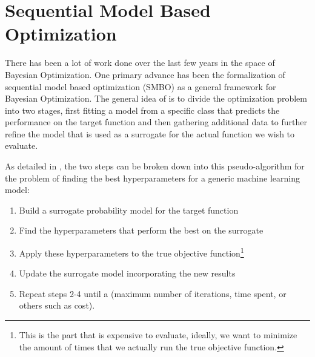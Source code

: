 \chapter{Sequential Model Based Optimization}

There has been a lot of work done over the last few years in the space of Bayesian Optimization. One primary advance has been the formalization of sequential model based optimization (SMBO) as a general framework for Bayesian Optimization. The general idea of  is to divide the optimization problem into two stages, first fitting a model from a specific class that predicts the performance on the target function and then gathering additional data to further refine the model that is used as a surrogate for the actual function we wish to evaluate.


As detailed in , the two steps can be broken down into this pseudo-algorithm for the problem of finding the best hyperparameters for a generic machine learning model: 

\begin{enumerate}
	\item Build a surrogate probability model for the target function
	\item Find the hyperparameters that perform the best on the surrogate
	\item Apply these hyperparameters to the true objective function\footnote{This is the part that is expensive to evaluate, ideally, we want to minimize the amount of times that we actually run the true objective function.}
	\item Update the surrogate model incorporating the new results
	\item Repeat steps 2-4 until a  (maximum number of iterations, time spent, or others such as cost).
\end{enumerate}

